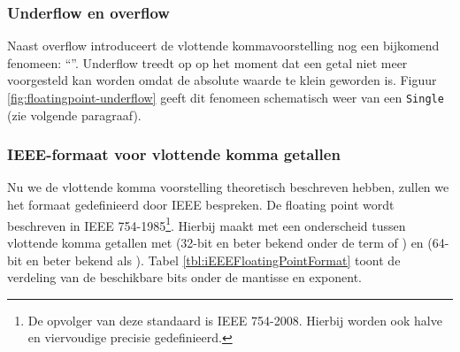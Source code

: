 \subsubsection{Underflow en overflow}
Naast overflow introduceert de vlottende kommavoorstelling nog een bijkomend fenomeen: ``''. Underflow treedt op op het moment dat een getal niet meer voorgesteld kan worden omdat de absolute waarde te klein geworden is. Figuur \ref{fig:floatingpoint-underflow} geeft dit fenomeen schematisch weer van een \texttt{Single} (zie volgende paragraaf).
\subsubsection{IEEE-formaat voor vlottende komma getallen}
Nu we de vlottende komma voorstelling theoretisch beschreven hebben, zullen we het formaat gedefinieerd door IEEE bespreken. De floating point wordt beschreven in IEEE 754-1985\footnote{De opvolger van deze standaard is IEEE 754-2008\cite{5976968}. Hierbij worden ook halve en viervoudige precisie gedefinieerd.}\cite{30711}. Hierbij maakt met een onderscheid tussen vlottende komma getallen met  (32-bit en beter bekend onder de term  of ) en  (64-bit en beter bekend als ). Tabel \ref{tbl:iEEEFloatingPointFormat} toont de verdeling van de beschikbare bits onder de mantisse en exponent.
\begin{table}[hbt]
\centering
{}
\caption{IEEE 754-1985 Floating Point.}
\end{table}
